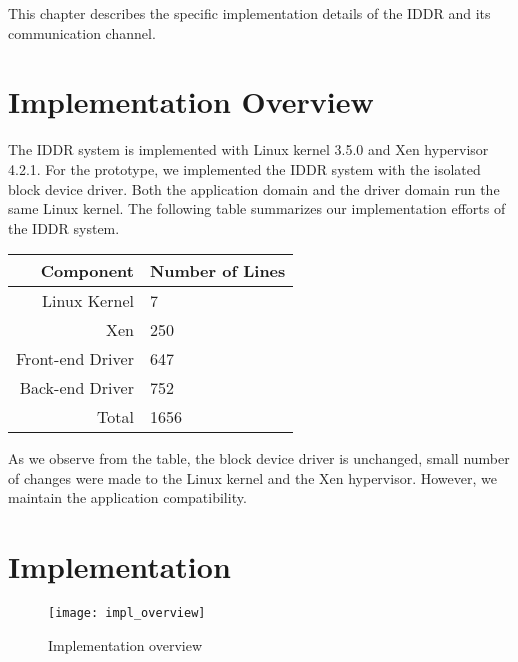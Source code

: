 This chapter describes the specific implementation details of the IDDR and its communication channel.

\section{Implementation Overview} 
The IDDR system is implemented with Linux kernel 3.5.0 and Xen hypervisor 4.2.1. For the prototype, we implemented the IDDR system with the isolated block device driver. Both the application domain and the driver domain run the same Linux kernel. The following table summarizes our implementation efforts of the IDDR system. 

\begin{center}
\begin{tabular}{|r|l|} 
  \hline
  Component & Number of Lines \\
  \hline
  Linux Kernel & 7 \\
  Xen & 250 \\
  Front-end Driver & 647 \\
  Back-end Driver & 752 \\
  \hline 
  Total & 1656\\
  \hline
\end{tabular}
\end{center}

As we observe from the table, the block device driver is unchanged, small number of changes were made to the Linux kernel and the Xen hypervisor. However, we maintain the application compatibility.
\pagebreak

\section{Implementation}

\begin{figure}[!ht]
\centering
\texttt{[image: impl\_overview]}
\caption{Implementation overview}
\label{fig:Implementation overview}
\end{figure}

